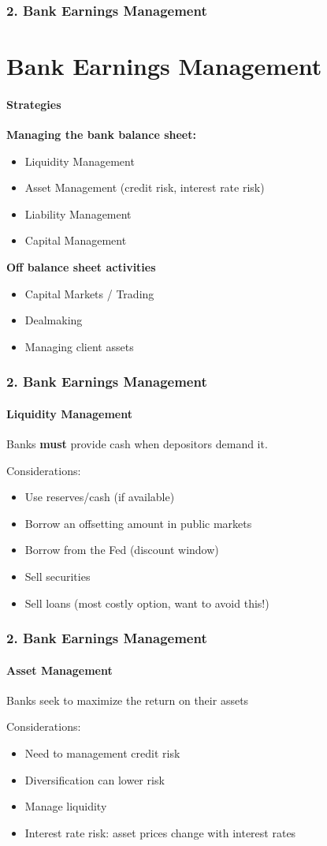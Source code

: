 \documentclass{beamer}
\begin{document}
\begin{frame}[t]
\frametitle{2. Bank Earnings Management}
\section{Bank Earnings Management}
\framesubtitle{Strategies}

    \textbf{Managing the bank balance sheet:}
    \begin{itemize}
        \item Liquidity Management
        \item Asset Management (credit risk, interest rate risk)
        \item Liability Management
        \item Capital Management
    \end{itemize}
    
    \textbf{Off balance sheet activities}
    \begin{itemize}
        \item Capital Markets / Trading
        \item Dealmaking
        \item Managing client assets
    \end{itemize}
\end{frame}

\begin{frame}[t]
\frametitle{2. Bank Earnings Management}
\framesubtitle{Liquidity Management}

    Banks \textbf{must} provide cash when depositors demand it.
    \vspace{1em}

    Considerations:
    \begin{itemize}
        \item Use reserves/cash (if available)
        \item Borrow an offsetting amount in public markets
        \item Borrow from the Fed (discount window)
        \item Sell securities
        \item Sell loans (most costly option, want to avoid this!)
    \end{itemize}

\end{frame}

\begin{frame}[t]
\frametitle{2. Bank Earnings Management}
\framesubtitle{Asset Management}

    Banks seek to maximize the return on their assets
    \vspace{1em}
    
    Considerations:
    \begin{itemize}
        \item Need to management credit risk
        \item Diversification can lower risk
        \item Manage liquidity
        \item Interest rate risk: asset prices change with interest rates
    \end{itemize}

\end{frame}
\end{document}
